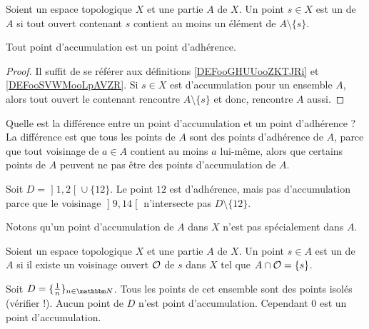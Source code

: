 \begin{definition}      \label{DEFooGHUUooZKTJRi}
    Soient un espace topologique \( X\) et une partie \( A\) de \( X\). Un point \( s\in X \) est un  de \( A\) si tout ouvert contenant \( s\) contient au moins un élément de \( A\setminus\{ s \}\).
\end{definition}

\begin{proposition}
  Tout point d'accumulation est un point d'adhérence.
\end{proposition}

\begin{proof}
  Il suffit de se référer aux définitions \ref{DEFooGHUUooZKTJRi} et \ref{DEFooSVWMooLpAVZR}. Si \( s \in X \) est d'accumulation pour un ensemble \( A \), alors tout ouvert le contenant rencontre \( A \setminus \{s \}\) et donc, rencontre \( A \) aussi.
\end{proof}

Quelle est la différence entre un point d'accumulation et un point d'adhérence ? La différence est que tous les points de \( A\) sont des points d'adhérence de \( A\), parce que tout voisinage de \( a\in A\) contient au moins \( a\) lui-même, alors que certains points de \( A\) peuvent ne pas être des points d'accumulation de \( A\).

\begin{example}     \label{EXooWOYQooJolaTV}
    Soit \( D=\mathopen] 1 , 2 \mathclose[\cup\{ 12 \}\). Le point \( 12\) est d'adhérence, mais pas d'accumulation parce que le voisinage \( \mathopen] 9 , 14 \mathclose[\) n'intersecte pas \( D\setminus \{ 12 \}\).

\end{example}

Notons qu'un point d'accumulation de \( A\) dans \( X\) n'est pas spécialement dans \( A\).

\begin{definition}      \label{DEFooXIOWooWUKJhN}
    Soient un espace topologique \( X\) et une partie \( A\) de \( X\). Un point \( s\in A \) est un  de \( A\) si il existe un voisinage ouvert \( \mathcal{O}\) de \( s\) dans \( X\) tel que \( A\cap\mathcal{O}=\{ s \}\).
\end{definition}


\begin{example}
	Soit $D=\{ \frac{1}{ n }\}_{n\in\eN}$. Tous les points de cet ensemble sont des points isolés (vérifier !).  Aucun point de $D$ n'est point d'accumulation. Cependant $0$ est un point d'accumulation.
\end{example}

